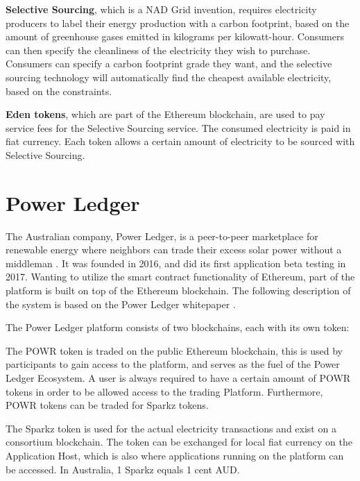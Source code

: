 \textbf{Selective Sourcing}, which is a NAD Grid invention, requires electricity producers to label their energy production with a carbon footprint, based on the amount of greenhouse gases emitted in kilograms per kilowatt-hour. Consumers can then specify the cleanliness of the electricity they wish to purchase. Consumers can specify a carbon footprint grade they want, and the selective sourcing technology will automatically find the cheapest available electricity, based on the constraints.

\textbf{Eden tokens}, which are part of the Ethereum blockchain, are used to pay service fees for the Selective Sourcing service. The consumed electricity is paid in fiat currency. Each token allows a certain amount of electricity to be sourced with Selective Sourcing.

\section{Power Ledger}
The Australian company, Power Ledger, is a peer-to-peer marketplace for renewable energy where neighbors can trade their excess solar power without a middleman  \cite{pl_home}. It was founded in 2016, and did its first application beta testing in 2017. Wanting to utilize the smart contract functionality of Ethereum, part of the platform is built on top of the Ethereum blockchain. The following description of the system is based on the Power Ledger whitepaper \cite{powerledger}.

The Power Ledger platform consists of two blockchains, each with its own token:

The POWR token is traded on the public Ethereum blockchain, this is used by participants to gain access to the platform, and serves as the fuel of the Power Ledger Ecosystem. A user is always required to have a certain amount of POWR tokens in order to be allowed access to the trading Platform. Furthermore, POWR tokens can be traded for Sparkz tokens.

The Sparkz token is used for the actual electricity transactions and exist on a consortium blockchain. The token can be exchanged for local fiat currency on the Application Host, which is also where applications running on the platform can be accessed. In Australia, 1 Sparkz equals 1 cent AUD.


